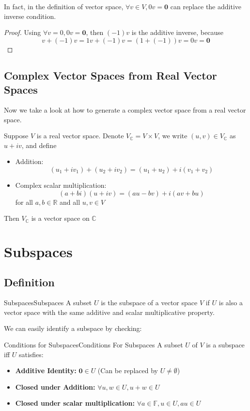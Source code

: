 \documentclass[../main.tex]{subfiles}
\begin{document}
\begin{remark}
In fact, in the definition of vector space, $\forall v \in V,0v=\boldsymbol{0}$ can replace the additive inverse condition.

\begin{proof}
Using $\forall v = 0,0v=\boldsymbol{0}$, then $(-1)v$ is the additive inverse, because 
\begin{equation*}
	v + (-1)v=  1v+(-1)v = (1+(-1))v = 0v = \boldsymbol{0}
\end{equation*}
\end{proof}
\end{remark}

\subsection{Complex Vector Spaces from Real Vector Spaces}
Now we take a look at how to generate a complex vector space from a real vector space.

Suppose $V$ is a real vector space. Denote $V_{\mathbb{C}} = V \times V$, we write $(u,v) \in V_{\mathbb{C}}$ as $u+iv$, and define
\begin{itemize}
\item Addition:
	\begin{equation*}
		(u_1+iv_1)+(u_2+iv_2) = (u_1+u_2)+i(v_1+v_2)
	\end{equation*}
\item Complex scalar multiplication:
	\begin{equation*}
		(a+bi)(u+iv) = (au-bv)+i(av+bu)
	\end{equation*}
	for all $a,b \in \mathbb{R}$ and all $u,v \in V$
\end{itemize}

Then $V_{\mathbb{C}}$ is a vector space on $\mathbb{C}$




\section{Subspaces}
\subsection{Definition}
\begin{definition}{Subspaces}{Subspaces}
A subset $U$ is the subspace of a vector space $V$ if $U$ is also a vector space with the same additive and scalar multiplicative property.
\end{definition}
We can easily identify a subspace by checking:
\begin{theorem}{Conditions for Subspaces}{Conditions For Subspaces}
A subset $U$ of $V$ is a subspace iff $U$ satisfies:
\begin{itemize}
\item \textbf{Additive Identity: } $\boldsymbol{0}\in U$ (Can be replaced by $U\neq \emptyset $)
\item \textbf{Closed under Addition: } $\forall u,w \in U, u+w \in U$ 
\item \textbf{Closed under scalar multiplication: }$\forall a \in \mathbb{F},u \in U,au \in U$
\end{itemize}
\end{theorem}
\end{document}
